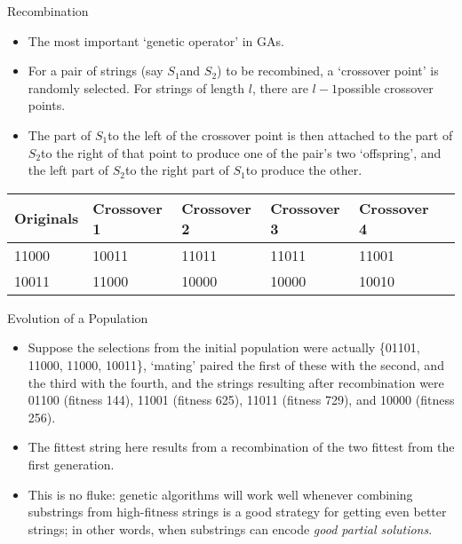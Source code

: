 \documentclass{article}
\begin{document}
\begin{slide}{}
{\Large Recombination}
\begin{itemize}
\item The most important `genetic operator' in GAs. 
\item For a pair of strings (say $S_1$\space and $S_2$) to be recombined,
a `crossover point' is randomly selected. For strings of length $l$, there are
$l-1$\space possible crossover points.
\item The part of $S_1$\space to the left of the
crossover point is then attached to the part of $S_2$\space to the right of
that point to produce one of the pair's two `offspring', and the left
part of $S_2$\space to the right part of $S_1$\space to produce the other.
\end{itemize}
{\tiny \begin{tabular}{|l||l|l|l|l|l|}\hline
Originals & Crossover 1 & Crossover 2 & Crossover 3 & Crossover 4\\ \hline
11000 & 10011 & 11011 & 11011 & 11001\\10011 & 11000 & 10000 & 10000 & 10010\\ \hline
\end{tabular}}
\end{slide}

\begin{slide}{}
{\Large Evolution of a Population}
\begin{itemize}
\item Suppose the selections from the initial population were actually
\{01101, 11000, 11000, 10011\}, `mating' paired the first of these
with the second, and the third with the fourth, and the strings resulting after
recombination were 01100 (fitness 144), 11001 (fitness 625), 11011
(fitness 729), and 10000 (fitness 256). 
\item The fittest string here
results from a recombination of the two fittest from the first
generation.
\item This is no fluke: genetic algorithms will work well
whenever combining substrings from high-fitness strings is a good strategy for
getting even better strings; in other words, when substrings can encode
{\em good partial solutions}.
\end{itemize}
\end{slide}
\end{document}
